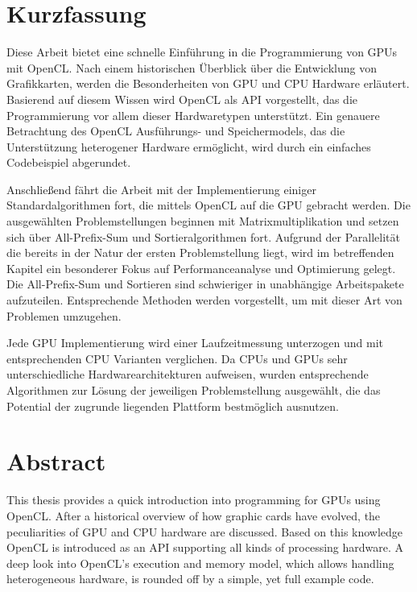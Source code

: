 \section*{Kurzfassung}

Diese Arbeit bietet eine schnelle Einführung in die Programmierung von GPUs mit OpenCL. Nach einem historischen Überblick über die Entwicklung von Grafikkarten, werden die Besonderheiten von GPU und CPU Hardware erläutert. Basierend auf diesem Wissen wird OpenCL als API vorgestellt, das die Programmierung vor allem dieser Hardwaretypen unterstützt. Ein genauere Betrachtung des OpenCL Ausführungs- und Speichermodels, das die Unterstützung heterogener Hardware ermöglicht, wird durch ein einfaches Codebeispiel abgerundet.

Anschließend fährt die Arbeit mit der Implementierung einiger Standardalgorithmen fort, die mittels OpenCL auf die GPU gebracht werden. Die ausgewählten Problemstellungen beginnen mit Matrixmultiplikation und setzen sich über All-Prefix-Sum und Sortieralgorithmen fort. Aufgrund der Parallelität die bereits in der Natur der ersten Problemstellung liegt, wird im betreffenden Kapitel ein besonderer Fokus auf Performanceanalyse und Optimierung gelegt. Die All-Prefix-Sum und Sortieren sind schwieriger in unabhängige Arbeitspakete aufzuteilen. Entsprechende Methoden werden vorgestellt, um mit dieser Art von Problemen umzugehen.

Jede GPU Implementierung wird einer Laufzeitmessung unterzogen und mit entsprechenden CPU Varianten verglichen. Da CPUs und GPUs sehr unterschiedliche Hardwarearchitekturen aufweisen, wurden entsprechende Algorithmen zur Lösung der jeweiligen Problemstellung ausgewählt, die das Potential der zugrunde liegenden Plattform bestmöglich ausnutzen.

\pagebreak

\section*{Abstract}

This thesis provides a quick introduction into programming for GPUs using OpenCL. After a historical overview of how graphic cards have evolved, the peculiarities of GPU and CPU hardware are discussed. Based on this knowledge OpenCL is introduced as an API supporting all kinds of processing hardware. A deep look into OpenCL's execution and memory model, which allows handling heterogeneous hardware, is rounded off by a simple, yet full example code.

